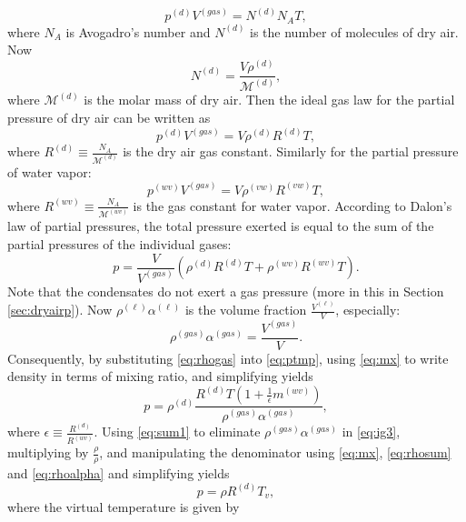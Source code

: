 \documentclass{agujournal}
\begin{document}
{\begin{equation}
p^{(d)}V^{(gas)}=N^{(d)}N_A T,
\end{equation}
where $N_A$ is Avogadro's number and $N^{(d)}$ is the number of molecules of dry air. Now
\begin{equation}
N^{(d)}=\frac{V \rho^{(d)}}{\mathcal{M}^{(d)}},
\end{equation}
where $\mathcal{M}^{(d)}$ is the molar mass of dry air. Then the ideal gas law for the partial pressure of dry air can be written as
\begin{equation}
p^{(d)}V^{(gas)}=V\rho^{(d)}R^{(d)}T,
\end{equation}
where $R^{(d)}\equiv \frac{N_A}{\mathcal{M}^{(d)}}$ is the dry air gas constant. Similarly for the partial pressure of water vapor:
\begin{equation}
p^{(wv)}V^{(gas)}=V\rho^{(vw)}R^{(vw)}T,
\end{equation}
where $R^{(wv)}\equiv \frac{N_A}{\mathcal{M}^{(wv)}}$ is the gas constant for water vapor. According to Dalon's law of partial pressures, the total pressure exerted is equal to the sum of the partial pressures of the individual gases:
\begin{equation}
\label{eq:ptmp}
p=\frac{V}{V^{(gas)}}\left( \rho^{(d)}R^{(d)}T+\rho^{(wv)}R^{(wv)}T\right).
\end{equation}
Note that the condensates do not exert a gas pressure (more in this in Section \ref{sec:dryairp}). Now $\rho^{(\ell)}\alpha^{(\ell)}$ is the volume fraction $\frac{V^{(\ell)}}{V}$, especially:
\begin{equation}
\rho^{(gas)}\alpha^{(gas)}=\frac{V^{(gas)}}{V}.\label{eq:rhogas}
\end{equation}
Consequently, by substituting \eqref{eq:rhogas} into \eqref{eq:ptmp}, using \eqref{eq:mx} to write density in terms of mixing ratio, and simplifying yields
\begin{equation}
p=\rho^{(d)}\frac{R^{(d)} T\left( 1+\frac{1}{\epsilon}m^{(wv)}\right)}{\rho^{(gas)}\alpha^{(gas)}}\label{eq:ig3},
\end{equation}
where $\epsilon\equiv \frac{R^{(d)}}{R^{(wv)}}$. Using \eqref{eq:sum1} to eliminate $\rho^{(gas)}\alpha^{(gas)}$ in \eqref{eq:ig3}, multiplying by $\frac{\rho}{\rho}$, and manipulating the denominator using \eqref{eq:mx}, \eqref{eq:rhosum} and \eqref{eq:rhoalpha} and simplifying  yields 
\begin{equation}
p=\rho R^{(d)} T_v\label{eq:igl},
\end{equation}
where the virtual temperature is given by
}
\end{document}
